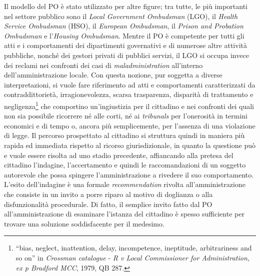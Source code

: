\documentclass[12pt,it,a4paper,]{report}
\begin{document}
Il modello del PO è stato utilizzato per altre figure; tra tutte, le più
importanti nel settore pubblico sono il \emph{Local Government
Ombudsman} (LGO), il \emph{Health Service Ombudsman} (HSO), il
\emph{European Ombudsman}, il \emph{Prison and Probation Ombudsman} e
l'\emph{Housing Ombudsman}. Mentre il PO è competente per tutti gli atti
e i comportamenti dei dipartimenti governativi e di numerose altre
attività pubbliche, nonché dei gestori privati di pubblici servizi, il
LGO si occupa invece dei reclami nei confronti dei casi di
\emph{maladministration} all'interno dell'amministrazione locale. Con
questa nozione, pur soggetta a diverse interpretazioni, si vuole fare
riferimento ad atti e comportamenti caratterizzati da contraddittorietà,
irragionevolezza, scarsa trasparenza, disparità di trattamento e
negligenza\footnote{``bias, neglect, inattention, delay, incompetence,
  ineptitude, arbitrariness and so on'' in \emph{Crossman catalogue} -
  \emph{R v Local Commissioner for Administration, ex p Bradford MCC},
  1979, QB 287.} che comportino un'ingiustizia per il cittadino e nei
confronti dei quali non sia possibile ricorrere né alle corti, né ai
\emph{tribunals} per l'onerosità in termini economici e di tempo o,
ancora più semplicemente, per l'assenza di una violazione di legge. Il
percorso prospettato al cittadino si struttura quindi in maniera più
rapida ed immediata rispetto al ricorso giurisdizionale, in quanto la
questione può e vuole essere risolta ad uno stadio precedente,
affiancando alla pretesa del cittadino l'indagine, l'accertamento e
quindi le raccomandazioni di un soggetto autorevole che possa spingere
l'amministrazione a rivedere il suo comportamento. L'esito dell'indagine
è una formale \emph{recommendation} rivolta all'amministrazione che
consiste in un invito a porre riparo al motivo di doglianza o alla
disfunzionalità procedurale. Di fatto, il semplice invito fatto dal PO
all'amministrazione di esaminare l'istanza del cittadino è spesso
sufficiente per trovare una soluzione soddisfacente per il medesimo.
\end{document}

